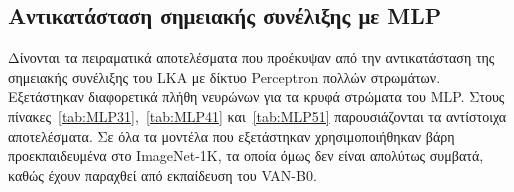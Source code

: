 \documentclass[12pt]{article}
\numberwithin{equation}{section}
\begin{document}
\subsection*{\thesection\quad Αντικατάσταση σημειακής συνέλιξης με MLP}\label{app:C}

Δίνονται τα πειραματικά αποτελέσματα που προέκυψαν από την αντικατάσταση της σημειακής συνέλιξης του LKA με δίκτυο Perceptron πολλών στρωμάτων. Εξετάστηκαν διαφορετικά πλήθη νευρώνων για τα κρυφά στρώματα του MLP. Στους πίνακες~\ref{tab:MLP31},~\ref{tab:MLP41} και~\ref{tab:MLP51} παρουσιάζονται τα αντίστοιχα αποτελέσματα. Σε όλα τα μοντέλα που εξετάστηκαν χρησιμοποιήθηκαν βάρη προεκπαιδευμένα στο ImageNet-1K, τα οποία όμως δεν είναι απολύτως συμβατά, καθώς έχουν παραχθεί από εκπαίδευση του VAN-B0.\\
\end{document}
